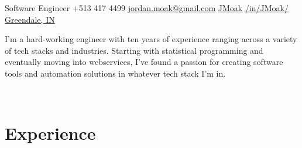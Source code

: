 \documentclass[]{moak-resume}
\begin{document}
            {Software Engineer}
            {\icon{\faPhone} +513 417 4499}
            {\icon{\faEnvelope[regular]} \href{mailto:jordan.moak@gmail.com}{ jordan.moak@gmail.com}}
            {\icon{\faGithub} \href{https://github.com/JMoak/}{ JMoak}}
            {\icon{\faLinkedin} \href{https://www.linkedin.com/in/jmoak/}{ /in/JMoak/}}
            {\icon{\faMapMarker} \href{https://www.google.com/maps/place/Greendale,+IN+47025/@39.1487958,-84.7652822,12z/data=!4m6!3m5!1s0x8841d3fcc3d9708d:0x528857ad3dfc5551!8m2!3d39.1125572!4d-84.8641178!16zL20vMHNrdHk?entry=ttu}{ Greendale, IN}}

\begin{aside}
  \small\bodyfont I'm a hard-working engineer with ten years of experience ranging across a variety of tech stacks and industries.  Starting with statistical programming and eventually moving into webservices, I've found a passion for creating software tools and automation solutions in whatever tech stack I'm in.
	\programmingPie{}
  ~
  ~
\end{aside}
~
\section{Experience}
\end{document}
